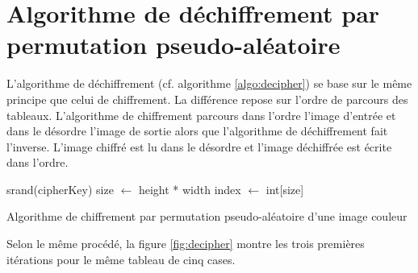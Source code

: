 \documentclass[a4paper]{article}
\begin{document}
    \section{Algorithme de déchiffrement par permutation pseudo-aléatoire}

        L'algorithme de déchiffrement (cf. algorithme \ref{algo:decipher}) se base sur le même principe que celui de chiffrement. La différence repose sur l'ordre de parcours des tableaux. L'algorithme de chiffrement parcours dans l'ordre l'image d'entrée et dans le désordre l'image de sortie alors que l'algorithme de déchiffrement fait l'inverse. L'image chiffré est lu dans le désordre et l'image déchiffrée est écrite dans l'ordre.

        \begin{algorithm}[htbp]
            \SetAlgoLined
            srand(cipherKey)\;
            size $\leftarrow$ height * width\;
            index $\leftarrow$ int[size]\;
            \caption{Algorithme de chiffrement par permutation pseudo-aléatoire d'une image couleur}
            \label{algo:decipher}
        \end{algorithm}

        Selon le même procédé, la figure \ref{fig:decipher} montre les trois premières itérations pour le même tableau de cinq cases.
\end{document}
